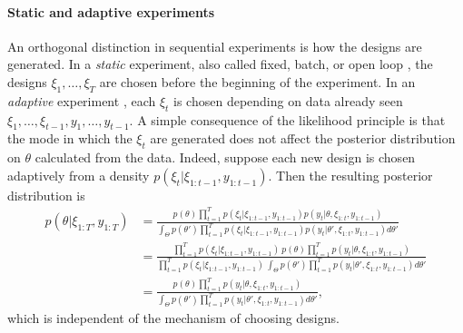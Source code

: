 \documentclass[a4paper, 10pt]{report}
\theoremstyle{plain}
\begin{document}
	\paragraph{Static and adaptive experiments}
	An orthogonal distinction in sequential experiments is how the designs are generated.
	In a \emph{static} experiment, also called fixed, batch, or open loop \citep{distefano2014schaum}, the designs $\xi_1,\dots,\xi_T$ are chosen before the beginning of the experiment.
	In an \emph{adaptive} experiment \citep{myung2013}, each $\xi_t$ is chosen depending on data already seen $\xi_1,\dots,\xi_{t-1},y_1,\dots,y_{t-1}$.
	A simple consequence of the likelihood principle \citep{barnard1962likelihood,birnbaum1962foundations} is that the mode in which the $\xi_t$ are generated does not affect the posterior distribution on $\theta$ calculated from the data. Indeed, suppose each new design is chosen adaptively from a density $p(\xi_t|\xi_{1:t-1},y_{1:t-1})$. Then the resulting posterior distribution is
	\begin{align}
	p(\theta|\xi_{1:T},y_{1:T}) &= \frac{p(\theta)\prod_{t=1}^T p(\xi_t|\xi_{1:t-1},y_{1:t-1}) p(y_t|\theta,\xi_{1:t},y_{1:t-1})}{\int_\Theta p(\theta')\prod_{t=1}^T p(\xi_t|\xi_{1:t-1},y_{1:t-1}) p(y_t|\theta',\xi_{1:t},y_{1:t-1}) d\theta'} \\
	&=\frac{\prod_{t=1}^T p(\xi_t|\xi_{1:t-1},y_{1:t-1}) \ p(\theta) \prod_{t=1}^T p(y_t|\theta,\xi_{1:t},y_{1:t-1})}{\prod_{t=1}^T p(\xi_t|\xi_{1:t-1},y_{1:t-1}) \ \int_\Theta p(\theta')\prod_{t=1}^T p(y_t|\theta',\xi_{1:t},y_{1:t-1}) d\theta'} \\
	&=\frac{p(\theta) \prod_{t=1}^T p(y_t|\theta,\xi_{1:t},y_{1:t-1})}{\int_\Theta p(\theta')\prod_{t=1}^T p(y_t|\theta',\xi_{1:t},y_{1:t-1}) d\theta'},
	\end{align}
	which is independent of the mechanism of choosing designs.
	
	
\end{document}
